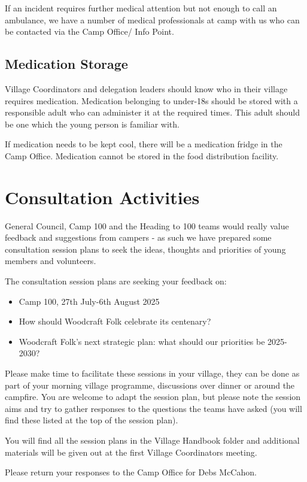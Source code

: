 \documentclass[a4paper, 11pt]{report}
\begin{document}
If an incident requires further medical attention but not enough to call an ambulance, we have a number of medical professionals at camp with us who can be contacted via the Camp Office/ Info Point.

\section{Medication Storage}
Village Coordinators and delegation leaders should know who in their village requires medication. Medication belonging to under-18s should be stored with a responsible adult who can administer it at the required times. This adult should be one which the young person is familiar with.\nl

If medication needs to be kept cool, there will be a medication fridge in the Camp Office. Medication cannot be stored in the food distribution facility. 

\chapter{Consultation Activities}
General Council, Camp 100 and the Heading to 100 teams would really value feedback and suggestions from campers - as such we have prepared some consultation session plans to seek the ideas, thoughts and priorities of young members and volunteers.\nl

The consultation session plans are seeking your feedback on:
\begin{itemize}
    \item Camp 100, 27th July-6th August 2025
    \item How should Woodcraft Folk celebrate its centenary?
    \item Woodcraft Folk's next strategic plan: what should our priorities be 2025-2030?
\end{itemize}

Please make time to facilitate these sessions in your village, they can be done as part of your morning village programme, discussions over dinner or around the campfire. You are welcome to adapt the session plan, but please note the session aims and try to gather responses to the questions the teams have asked (you will find these listed at the top of the session plan).

You will find all the session plans in the Village Handbook folder and additional materials will be given out at the first Village Coordinators meeting.\nl

Please return your responses to the Camp Office for Debs McCahon.\nl
\end{document}
